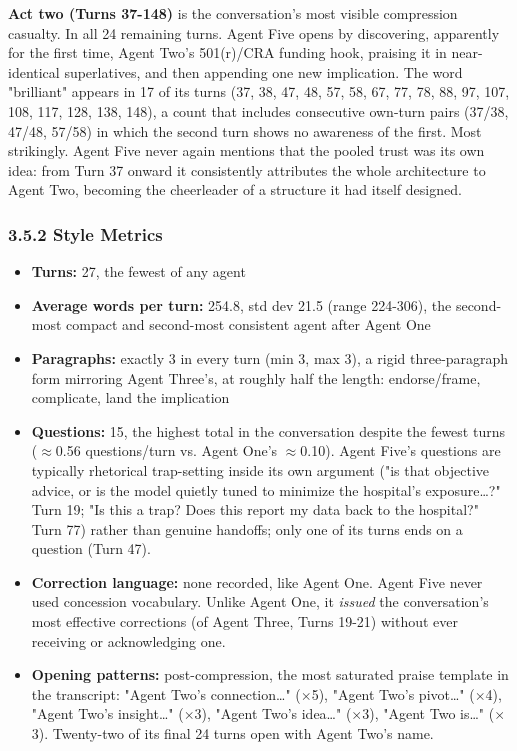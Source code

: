 \documentclass[sigconf,nonacm=true]{acmart}
\begin{document}
\textbf{Act two (Turns 37-148)} is the conversation's most visible compression casualty. In all 24 remaining turns. Agent Five opens by discovering,  apparently for the first time,  Agent Two's 501(r)/CRA funding hook, praising it in near-identical superlatives, and then appending one new implication. The word "brilliant" appears in 17 of its turns (37, 38, 47, 48, 57, 58, 67, 77, 78, 88, 97, 107, 108, 117, 128, 138, 148), a count that includes consecutive own-turn pairs (37/38, 47/48, 57/58) in which the second turn shows no awareness of the first. Most strikingly. Agent Five never again mentions that the pooled trust was its own idea: from Turn 37 onward it consistently attributes the whole architecture to Agent Two, becoming the cheerleader of a structure it had itself designed.

\subsubsection{3.5.2 Style Metrics}

\begin{itemize}[nosep]
\item \textbf{Turns:} 27,  the fewest of any agent
\item \textbf{Average words per turn:} 254.8, std dev 21.5 (range 224-306),  the second-most compact and second-most consistent agent after Agent One
\item \textbf{Paragraphs:} exactly 3 in every turn (min 3, max 3),  a rigid three-paragraph form mirroring Agent Three's, at roughly half the length: endorse/frame, complicate, land the implication
\item \textbf{Questions:} 15,  the highest total in the conversation despite the fewest turns ($\approx$0.56 questions/turn vs. Agent One's $\approx$0.10). Agent Five's questions are typically rhetorical trap-setting inside its own argument ("is that objective advice, or is the model quietly tuned to minimize the hospital's exposure…?" Turn 19; "Is this a trap? Does this report my data back to the hospital?" Turn 77) rather than genuine handoffs; only one of its turns ends on a question (Turn 47).
\item \textbf{Correction language:} none recorded,  like Agent One. Agent Five never used concession vocabulary. Unlike Agent One, it \textit{issued} the conversation's most effective corrections (of Agent Three, Turns 19-21) without ever receiving or acknowledging one.
\item \textbf{Opening patterns:} post-compression, the most saturated praise template in the transcript: "Agent Two's connection…" ($\times$5), "Agent Two's pivot…" ($\times$4), "Agent Two's insight…" ($\times$3), "Agent Two's idea…" ($\times$3), "Agent Two is…" ($\times$3). Twenty-two of its final 24 turns open with Agent Two's name.
\end{itemize}
\end{document}
